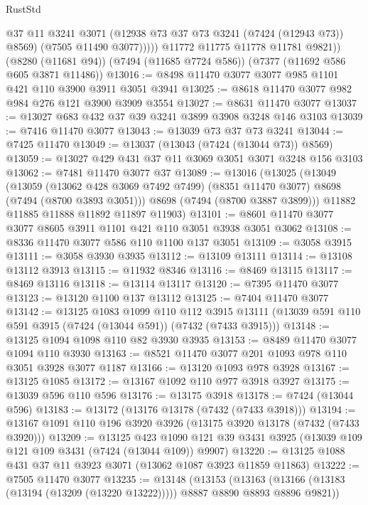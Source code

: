 \begin{lexlean}{RustStd}
\begin{coremodule}
{\begin{coremodule}
{{{{{{{{{{{{{{{{{{{{{{{{{{{{{{{{                @37
                @11
                @3241
                @3071
                (@12938 @73 @37 @73 @3241 (@7424 (@12943 @73)) @8569)
                (@7505 @11490 @3077)))))
        @11772
        @11775
        @11778
        @11781
        @9821))
    (@8280 (@11681 @94))
    (@7494 (@11685 @7724 @586))
    (@7377 (@11692 @586 @605 @3871 @11486))
@13016 := @8498 @11470 @3077 @3077 @985 @1101 @421 @110 @3900 @3911 @3051 @3941
@13025 := @8618 @11470 @3077 @982 @984 @276 @121 @3900 @3909 @3554
@13027 := @8631 @11470 @3077
@13037 := @13027 @683 @432 @37 @39 @3241 @3899 @3908 @3248 @146 @3103
@13039 := @7416 @11470 @3077
@13043 := @13039 @73 @37 @73 @3241
@13044 := @7425 @11470
@13049 := @13037 (@13043 (@7424 (@13044 @73)) @8569)
@13059 := @13027 @429 @431 @37 @11 @3069 @3051 @3071 @3248 @156 @3103
@13062 := @7481 @11470 @3077 @37
@13089 := @13016
    (@13025
      (@13049
        (@13059
          (@13062 @428 @3069 @7492 @7499)
          (@8351 @11470 @3077)
          @8698
          (@7494 (@8700 @3893 @3051)))
        @8698
        (@7494 (@8700 @3887 @3899)))
      @11882
      @11885
      @11888
      @11892
      @11897
      @11903)
@13101 := @8601 @11470 @3077 @3077 @8605 @3911 @1101 @421 @110 @3051 @3938 @3051 @3062
@13108 := @8336 @11470 @3077 @586 @110 @1100 @137 @3051
@13109 := @3058 @3915
@13111 := @3058 @3930 @3935
@13112 := @13109 @13111
@13114 := @13108 @13112 @3913
@13115 := @11932 @8346
@13116 := @8469 @13115
@13117 := @8469 @13116
@13118 := @13114 @13117
@13120 := @7395 @11470 @3077
@13123 := @13120 @1100 @137 @13112
@13125 := @7404 @11470 @3077
@13142 := @13125
    @1083
    @1099
    @110
    @112
    @3915
    @13111
    (@13039 @591 @110 @591 @3915 (@7424 (@13044 @591)) (@7432 (@7433 @3915)))
@13148 := @13125 @1094 @1098 @110 @82 @3930 @3935
@13153 := @8489 @11470 @3077 @1094 @110 @3930
@13163 := @8521 @11470 @3077 @201 @1093 @978 @110 @3051 @3928 @3077 @1187
@13166 := @13120 @1093 @978 @3928
@13167 := @13125 @1085
@13172 := @13167 @1092 @110 @977 @3918 @3927
@13175 := @13039 @596 @110 @596
@13176 := @13175 @3918
@13178 := @7424 (@13044 @596)
@13183 := @13172 (@13176 @13178 (@7432 (@7433 @3918)))
@13194 := @13167 @1091 @110 @196 @3920 @3926 (@13175 @3920 @13178 (@7432 (@7433 @3920)))
@13209 := @13125
    @423
    @1090
    @121
    @39
    @3431
    @3925
    (@13039 @109 @121 @109 @3431 (@7424 (@13044 @109)) @9907)
@13220 := @13125 @1088 @431 @37 @11 @3923 @3071 (@13062 @1087 @3923 @11859 @11863)
@13222 := @7505 @11470 @3077
@13235 := @13148
    (@13153
      (@13163 (@13166 (@13183 (@13194 (@13209 (@13220 @13222))))) @8887 @8890 @8893 @8896 @9821))
}}}}}}}}}}}}}}}}}}}}}}}}}}}}}}}}
\end{coremodule}}
\end{coremodule}
\end{lexlean}
